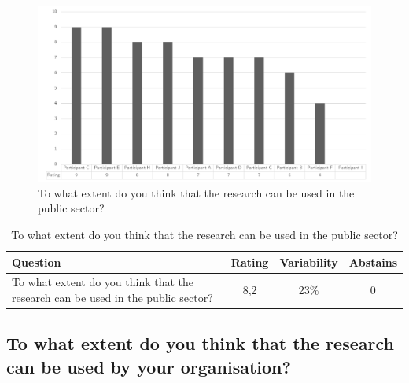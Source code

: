 \begin{figure}[H]
	\centering
	\includegraphics[width=0.9\linewidth]{images/validationresult_researchrelevancepublicsector}
	\caption[To what extent do you think that the research can be used in the public sector?]{To what extent do you think that the research can be used in the public sector?}
	\label{fig:validationrelevantps}
\end{figure}
\begin{table}[H]
	\centering
	\begin{tabular}{p{}ccc}
		\toprule
		\textbf{Question} & \textbf{Rating} & \textbf{Variability} & \textbf{Abstains} \\
		\midrule
		To what extent do you think that the research can be used in the public sector? & 8,2 & 23\% & 0 \\%
		\bottomrule
	\end{tabular}%
	\caption[To what extent do you think that the research can be used in the public sector?]{To what extent do you think that the research can be used in the public sector?}
	\label{tab:validationrelevantps}%
\end{table}%

\subsection{To what extent do you think that the research can be used by your organisation?}
\label{sub:validationrelevantorganisation}


